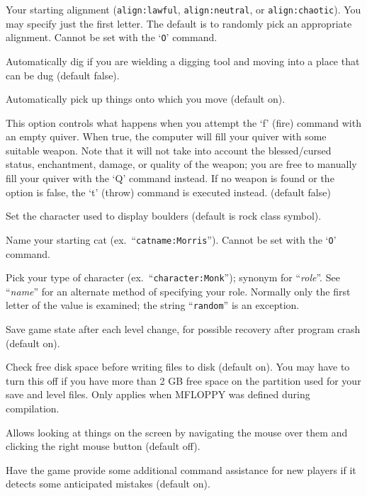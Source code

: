 \blist{}
\item[\ib{align}]
Your starting alignment ({\tt align:lawful}, {\tt align:neutral},
or {\tt align:chaotic}).  You may specify just the first letter.
The default is to randomly pick an appropriate alignment.
Cannot be set with the `{\tt O}' command.
\item[\ib{autodig}]
Automatically dig if you are wielding a digging tool and moving into a place
that can be dug (default false).
\item[\ib{autopickup}]
Automatically pick up things onto which you move (default on).
\item[\ib{autoquiver}]
This option controls what happens when you attempt the `f' (fire)
command with an empty quiver.  When true, the computer will fill
your quiver with some suitable weapon.  Note that it will not take
into account the blessed/cursed status, enchantment, damage, or
quality of the weapon; you are free to manually fill your quiver with
the `Q' command instead.  If no weapon is found or the option is
false, the `t' (throw) command is executed instead.  (default false)
\item[\ib{boulder}]
Set the character used to display boulders (default is rock class symbol).
\item[\ib{catname}]
Name your starting cat (ex.\ ``{\tt catname:Morris}'').
Cannot be set with the `{\tt O}' command.
\item[\ib{character}]
Pick your type of character (ex.\ ``{\tt character:Monk}'');
synonym for ``{\it role\/}''.  See ``{\it name\/}'' for an alternate method
of specifying your role.  Normally only the first letter of
the value is examined; the string ``{\tt random}'' is an exception.
\item[\ib{checkpoint}]
Save game state after each level change, for possible recovery after
program crash (default on).
\item[\ib{checkspace}]
Check free disk space before writing files to disk (default on).
You may have to turn this off if you have more than 2 GB free space
on the partition used for your save and level files.
Only applies when MFLOPPY was defined during compilation.
\item[\ib{clicklook}]
Allows looking at things on the screen by navigating the mouse
over them and clicking the right mouse button (default off).
\item[\ib{cmdassist}]
Have the game provide some additional command assistance for new 
players if it detects some anticipated mistakes (default on).
